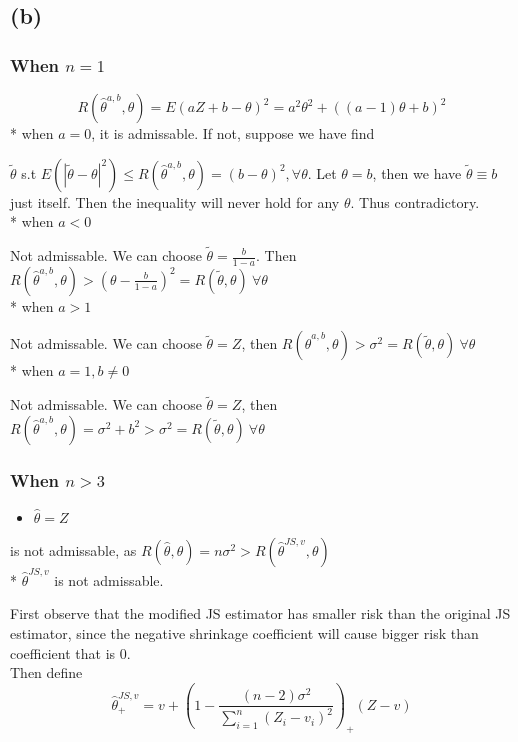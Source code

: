 \documentclass[]{article}
\providecommand{\tightlist}{%
  \setlength{\itemsep}{0pt}\setlength{\parskip}{0pt}}
\begin{document}
\subsection{(b)}\label{b-1}

\subsubsection{\texorpdfstring{When
\(n = 1\)}{When n = 1}}\label{when-n-1}

\[ R(\hat{\theta}^{a,b},\theta) = E(aZ+b-\theta)^2 = a^2\theta^2 + ((a-1)\theta+b)^2\]
* when \(a = 0\), it is admissable. If not, suppose we have find

\(\tilde{\theta}\) s.t
\(E(|\tilde{\theta}-\theta|^2) \leq R(\hat{\theta}^{a,b},\theta) = (b-\theta)^2, \forall \theta\).
Let \(\theta = b\), then we have \(\tilde{\theta} \equiv b\) just
itself. Then the inequality will never hold for any \(\theta\). Thus
contradictory.\\
* when \(a < 0\)

Not admissable. We can choose \(\tilde{\theta} = \frac{b}{1-a}\). Then
\(R(\hat{\theta}^{a,b},\theta) > (\theta-\frac{b}{1-a})^2 = R(\tilde{\theta},\theta) \ \forall \theta\)\\
* when \(a>1\)

Not admissable. We can choose \(\tilde{\theta} = Z\), then
\(R(\hat{\theta}^{a,b},\theta) > \sigma^2 = R(\tilde{\theta},\theta) \ \forall \theta\)\\
* when \(a=1, b\neq 0\)

Not admissable. We can choose \(\tilde{\theta} = Z\), then
\(R(\hat{\theta}^{a,b},\theta) = \sigma^2 + b^2 > \sigma^2 = R(\tilde{\theta},\theta) \ \forall \theta\)

\subsubsection{\texorpdfstring{When
\(n > 3\)}{When n \textgreater{} 3}}\label{when-n-3}

\begin{itemize}
\tightlist
\item
  \(\hat{\theta} = Z\)
\end{itemize}

is not admissable, as
\(R(\hat{\theta},\theta) = n\sigma^2 > R(\hat{\theta}^{JS,v}, \theta)\)\\
* \(\hat{\theta}^{JS,v}\) is not admissable.

First observe that the modified JS estimator has smaller risk than the
original JS estimator, since the negative shrinkage coefficient will
cause bigger risk than coefficient that is 0.\\
Then define
\[\widehat{\theta}^{JS,v}_+ = v + \left(1 -\frac{(n - 2) \sigma^{2}} {\sum_{i = 1}^{n} \left(Z_{i}-v_{i} \right) ^{ 2 }} \right)_+ (Z - v)\]
\end{document}
